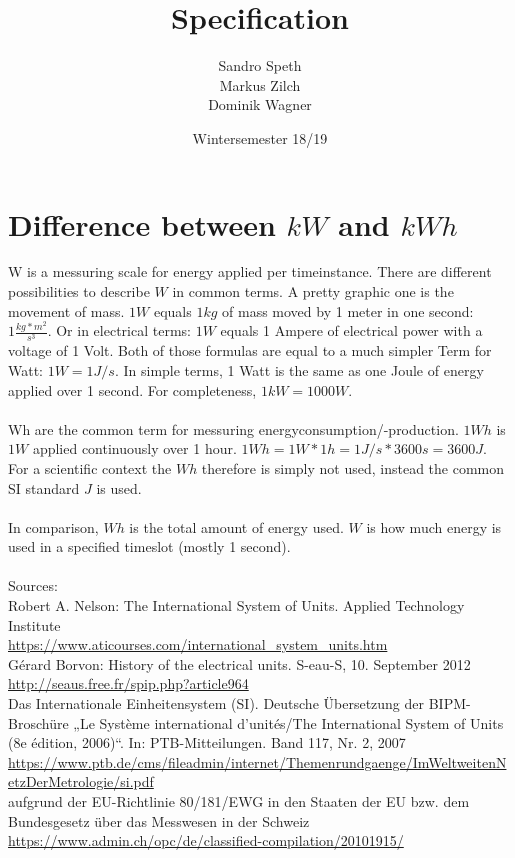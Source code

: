\documentclass[12pt]{scrartcl}
\title{Specification}
\date{Wintersemester 18/19}
\author{Sandro Speth\\
Markus Zilch\\
Dominik Wagner}
\begin{document}
\maketitle


\section{Difference between $kW$ and $kWh$}
W is a messuring scale for energy applied per timeinstance.
There are different possibilities to describe $W$ in common terms.
A pretty graphic one is the movement of mass.
$1W$ equals $1kg$ of mass moved by 1 meter in one second: $1 \frac{kg*m^2}{s^3}$.
Or in electrical terms: $1W$ equals 1 Ampere of electrical power with a voltage of 1 Volt.
Both of those formulas are equal to a much simpler Term for Watt: $1 W = 1 J/s$.
In simple terms, 1 Watt is the same as one Joule of energy applied over 1 second.
For completeness, $1kW = 1000 W$.\\
\\
Wh are the common term for messuring energyconsumption/-production.
$1Wh$ is $1W$ applied continuously over 1 hour.
 $1Wh = 1 W * 1h = 1 J/s * 3600s = 3600J$.
 For a scientific context the $Wh$ therefore is simply not used, instead the common SI standard $J$ is used.\\
\\
In comparison, $Wh$ is the total amount of energy used. $W$ is how much energy is used in a specified timeslot (mostly 1 second).\\
\\
Sources:\\
Robert A. Nelson: The International System of Units. Applied Technology Institute\\
\url{https://www.aticourses.com/international_system_units.htm}\\
Gérard Borvon: History of the electrical units. S-eau-S, 10. September 2012\\
\url{http://seaus.free.fr/spip.php?article964}\\
Das Internationale Einheitensystem (SI). Deutsche Übersetzung der BIPM-Broschüre „Le Système international d’unités/The International System of Units (8e édition, 2006)“. In: PTB-Mitteilungen. Band 117, Nr. 2, 2007\\
\url{https://www.ptb.de/cms/fileadmin/internet/Themenrundgaenge/ImWeltweitenNetzDerMetrologie/si.pdf}\\
aufgrund der EU-Richtlinie 80/181/EWG in den Staaten der EU bzw. dem Bundesgesetz über das Messwesen in der Schweiz\\
\url{https://www.admin.ch/opc/de/classified-compilation/20101915/}
\end{document}
